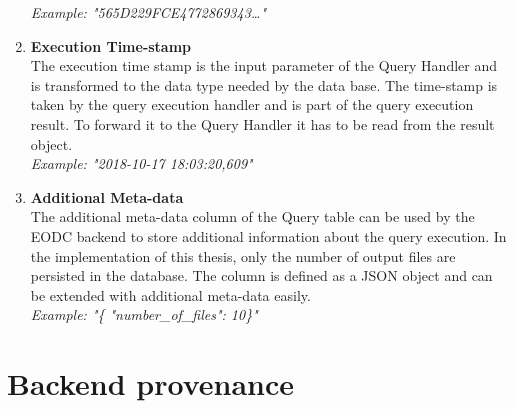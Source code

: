 \documentclass[draft,final]{vutinfth} %
\begin{document}
\begin{enumerate}
	\textit{Example: "565D229FCE4772869343\dots"} 
	\item \textbf{Execution Time-stamp} \\
	The execution time stamp is the input parameter of the Query Handler and is transformed to the data type needed by the data base. The time-stamp is taken by the query execution handler and is part of the query execution result. To forward it to the Query Handler it has to be read from the result object. \\
	\textit{Example: "2018-10-17 18:03:20,609"}  
	\item \textbf{Additional Meta-data} \\
	The additional meta-data column of the Query table can be used by the EODC backend to store additional information about the query execution. In the implementation of this thesis, only the number of output files are persisted in the database. The column is defined as a JSON object and can be extended with additional meta-data easily. \\
	\textit{Example: "\{ "number\_of\_files": 10\}"}    	 
\end{enumerate}


\section{Backend provenance}\label{Implementation:Backend provenance}
\end{document}

